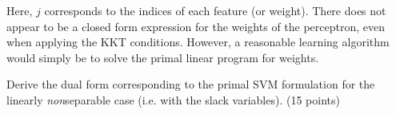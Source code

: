 \documentclass[fleqn]{homework}
\begin{document}
\begin{problem}{3}
    Here, $j$ corresponds to the indices of each feature (or weight).  There
    does not appear to be a closed form expression for the weights of the
    perceptron, even when applying the KKT conditions.  However, a reasonable
    learning algorithm would simply be to solve the primal linear program for
    weights.
  \end{problem}

  \begin{problem}{4}
    \begin{question}
      Derive the dual form corresponding to the primal SVM formulation for the
      linearly \textit{non}separable case (i.e. with the slack variables). (15
      points)
    \end{question}
  \end{problem}
\end{document}

